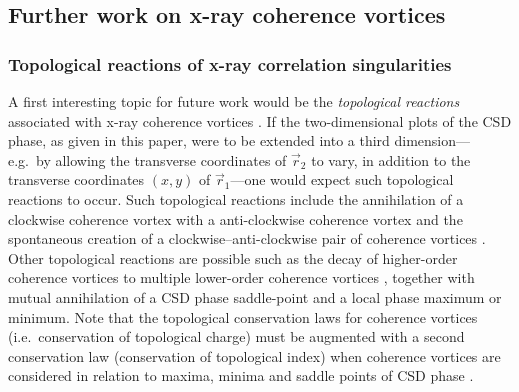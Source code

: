 \documentclass[%
 reprint,
 amsmath,amssymb,
 aps,
]{revtex4-1}
\begin{document}



\subsection{Further work on x-ray coherence vortices}\label{subsec:Discussion-part-3}

\subsubsection{Topological reactions of x-ray correlation singularities} A first interesting topic for future work would be the {\em topological reactions} associated with x-ray coherence vortices \cite{GburSPIE,TopologicalReactionsCohVortices,Marasinghe2010}.  If the two-dimensional plots of the CSD phase, as given in this paper, were to be extended into a third dimension---e.g.~by allowing the transverse coordinates of $\vec{r}_2$ to vary, in addition to the transverse coordinates $(x,y)$ of $\vec{r}_1$---one would expect such topological reactions to occur.  Such topological reactions include the annihilation of a clockwise coherence vortex with a anti-clockwise coherence vortex and the spontaneous creation of a clockwise--anti-clockwise pair of coherence vortices \cite{TopologicalReactionsCohVortices}.  Other topological reactions are possible such as the decay of higher-order coherence vortices to multiple lower-order coherence vortices \cite{TopologicalReactionsCohVortices}, together with mutual annihilation of a CSD phase saddle-point and a local phase maximum or minimum.  Note that the topological conservation laws for coherence vortices (i.e.~conservation of topological charge) must be augmented with a second conservation law (conservation of topological index) when coherence vortices are considered in relation to maxima, minima and saddle points of CSD phase \cite{MaysPonsaingPaganin2018}.  
\end{document}
